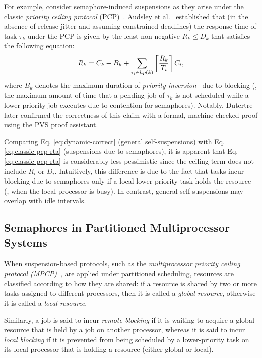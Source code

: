 For example, consider semaphore-induced suspensions as they arise under the classic \emph{priority ceiling protocol} (PCP)~\cite{SRL:90}. Audsley et al.~\cite{audsley-1993} established that (in the absence of release jitter and assuming constrained deadlines) the response time of task $\tau_k$ under the PCP is given by the least non-negative $R_k \leq D_k$ that satisfies the following equation:
\begin{equation}
R_k = C_k+ B_k+\sum_{\tau_i \in hp(k)}\left\lceil{\frac{R_k}{T_i}}\right\rceil C_i,
\label{eq:classic-pcp-rta}
\end{equation}
where $B_k$ denotes the maximum duration of \emph{priority inversion}~\cite{SRL:90} due to blocking (\ie, the maximum amount of time that a pending job of $\tau_k$ is not scheduled while a lower-priority job executes due to contention for semaphores). Notably, Dutertre~\cite{Du:99} later confirmed the correctness of this claim  with a formal, machine-checked proof using the PVS proof assistant. 

Comparing Eq. \eqref{eq:dynamic-correct} (general self-suspensions) with Eq.  \eqref{eq:classic-pcp-rta} (suspensions due to semaphores), it is apparent that Eq. \eqref{eq:classic-pcp-rta} is considerably less pessimistic since the ceiling term does not include $R_i$ or $D_i$. Intuitively, this difference is due to the fact that tasks incur blocking due to semaphores only if a local lower-priority task holds the resource (\ie, when the local processor is busy). In contrast, general self-suspensions may overlap with idle intervals.


\subsection{Semaphores in Partitioned Multiprocessor Systems}
\label{sec:sem-multi}

When suspension-based protocols, such as the \emph{multiprocessor priority ceiling protocol (MPCP)}~\cite{rajkumar-1990}, are applied under partitioned scheduling, resources are classified according to how they are shared: if a resource is shared by two or more tasks assigned to different processors, then it is called a \emph{global resource}, otherwise it is called a \emph{local resource}.

Similarly, a job is said to incur \emph{remote blocking} if it is waiting to acquire a global resource that is held by a job on another processor, whereas it is said to incur \emph{local blocking} if it is prevented from being scheduled by a lower-priority task on its local processor that is holding a resource (either global or local).

